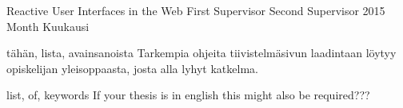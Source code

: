 %
%


{}\finfalse

{Reactive User Interfaces in the Web}
{First Supervisor}
{Second Supervisor}
{2015}
{Month}
{Kuukausi} 


\gentitle

\begin{ittiivis}{tähän, lista, avainsanoista}
Tarkempia ohjeita tiivistelmäsivun laadintaan löytyy opiskelijan
yleisoppaasta, josta alla lyhyt katkelma.
\end{ittiivis}

\begin{itabstract}{list, of, keywords}
If your thesis is in english this might also be required???
\end{itabstract}


%
%
\pagestyle{empty}


%
%
\tableofcontents
\clearpage
\listoffigures 
\clearpage
\listoftables

